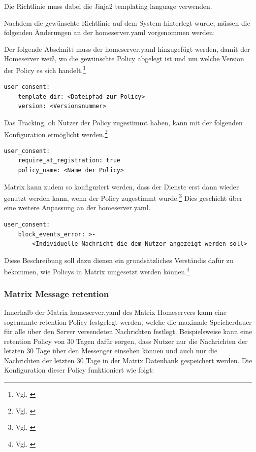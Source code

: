 Die Richtlinie muss dabei die Jinja2 templating language verwenden.

Nachdem die gewünschte Richtlinie auf dem System hinterlegt wurde, müssen die folgenden Änderungen an der homeserver.yaml vorgenommen werden:

Der folgende Abschnitt muss der homeserver.yaml hinzugefügt werden, damit der Homeserver weiß, wo die gewünschte Policy abgelegt ist und um welche Version der Policy es sich handelt.\footnote{Vgl. \cite{Matrix.org-custom-policies2020}}

\begin{lstlisting}
user_consent:
    template_dir: <Dateipfad zur Policy>
    version: <Versionsnummer>
\end{lstlisting}

Das Tracking, ob Nutzer der Policy zugestimmt haben, kann mit der folgenden Konfiguration ermöglicht werden.\footnote{Vgl. \cite{Matrix.org-custom-policies2020}}

\begin{lstlisting}
user_consent:
    require_at_registration: true
    policy_name: <Name der Policy>
\end{lstlisting}

Matrix kann zudem so konfiguriert werden, dass der Dienste erst dann wieder genutzt werden kann, wenn der Policy zugestimmt wurde.\footnote{Vgl. \cite{Matrix.org-custom-policies2020}}
Dies geschieht über eine weitere Anpassung an der homeserver.yaml.

\begin{lstlisting}
user_consent:
    block_events_error: >-
        <Individuelle Nachricht die dem Nutzer angezeigt werden soll>
\end{lstlisting}

Diese Beschreibung soll dazu dienen ein grundsätzliches Verständis dafür zu bekommen, wie Policys in Matrix umgesetzt werden können.\footnote{Vgl. \cite{Matrix.org-custom-policies2020}}

\subsubsection{Matrix Message retention}\label{chapter:vdmf}
Innerhalb der Matrix homeserver.yaml des Matrix Homeservers kann eine sogenannte retention Policy festgelegt werden, welche die maximale Speicherdauer für alle über den Server versendeten Nachrichten festlegt. Beispielsweise kann eine retention Policy von 30 Tagen dafür sorgen, dass Nutzer nur die Nachrichten der letzten 30 Tage über den Messenger einsehen können und auch nur die Nachrichten der letzten 30 Tage in der Matrix Datenbank gespeichert werden. Die Konfiguration dieser Policy funktioniert wie folgt:

